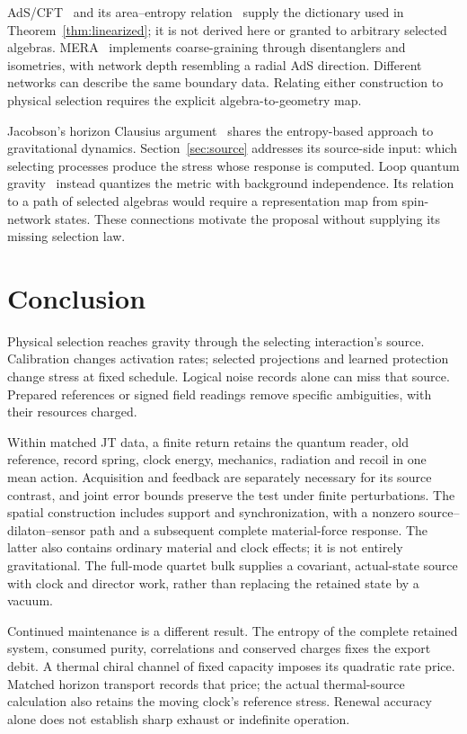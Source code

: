 \documentclass[12pt,a4paper]{article}
\begin{document}
AdS/CFT~\cite{Maldacena1999} and its area--entropy relation~\cite{RyuTakayanagi2006} supply the dictionary used in Theorem~\ref{thm:linearized}; it is not derived here or granted to arbitrary selected algebras. MERA~\cite{Vidal2008,Swingle2012} implements coarse-graining through disentanglers and isometries, with network depth resembling a radial AdS direction. Different networks can describe the same boundary data. Relating either construction to physical selection requires the explicit algebra-to-geometry map.

Jacobson's horizon Clausius argument~\cite{Jacobson1995} shares the entropy-based approach to gravitational dynamics. Section~\ref{sec:source} addresses its source-side input: which selecting processes produce the stress whose response is computed. Loop quantum gravity~\cite{Rovelli2004,Thiemann2007} instead quantizes the metric with background independence. Its relation to a path of selected algebras would require a representation map from spin-network states. These connections motivate the proposal without supplying its missing selection law.

\section{Conclusion}
\label{sec:conclusion}

Physical selection reaches gravity through the selecting interaction's source. Calibration changes activation rates; selected projections and learned protection change stress at fixed schedule. Logical noise records alone can miss that source. Prepared references or signed field readings remove specific ambiguities, with their resources charged.

Within matched JT data, a finite return retains the quantum reader, old reference, record spring, clock energy, mechanics, radiation and recoil in one mean action. Acquisition and feedback are separately necessary for its source contrast, and joint error bounds preserve the test under finite perturbations. The spatial construction includes support and synchronization, with a nonzero source--dilaton--sensor path and a subsequent complete material-force response. The latter also contains ordinary material and clock effects; it is not entirely gravitational. The full-mode quartet bulk supplies a covariant, actual-state source with clock and director work, rather than replacing the retained state by a vacuum.

Continued maintenance is a different result. The entropy of the complete retained system, consumed purity, correlations and conserved charges fixes the export debit. A thermal chiral channel of fixed capacity imposes its quadratic rate price. Matched horizon transport records that price; the actual thermal-source calculation also retains the moving clock's reference stress. Renewal accuracy alone does not establish sharp exhaust or indefinite operation.
\end{document}
